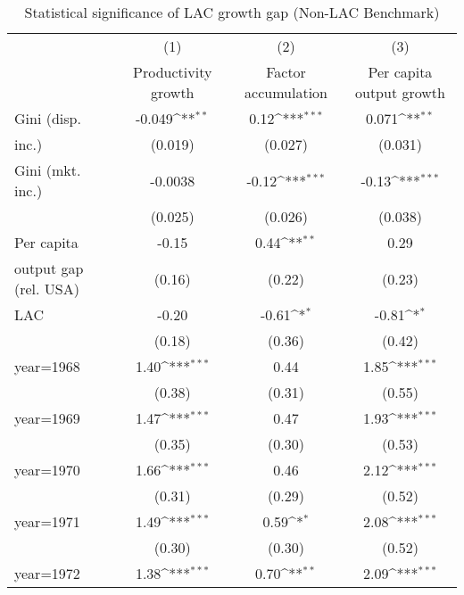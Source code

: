 \begin{sidewaystable}[htbp]\centering
\def\sym#1{\ifmmode^{#1}\else\(^{#1}\)\fi}
\caption{Statistical significance of LAC growth gap (Non-LAC Benchmark)}
\begin{tabular}{l*{3}{c}}
\toprule
                &\multicolumn{1}{c}{(1)}&\multicolumn{1}{c}{(2)}&\multicolumn{1}{c}{(3)}\\
                &\multicolumn{1}{c}{Productivity growth}&\multicolumn{1}{c}{Factor accumulation}&\multicolumn{1}{c}{Per capita output growth}\\
\midrule
Gini (disp.     &   -0.049\sym{**} &     0.12\sym{***}&    0.071\sym{**} \\
inc.)           &  (0.019)         &  (0.027)         &  (0.031)         \\
\addlinespace
Gini (mkt. inc.)&  -0.0038         &    -0.12\sym{***}&    -0.13\sym{***}\\
                &  (0.025)         &  (0.026)         &  (0.038)         \\
\addlinespace
Per capita      &    -0.15         &     0.44\sym{**} &     0.29         \\
output gap (rel. USA)&   (0.16)         &   (0.22)         &   (0.23)         \\
\addlinespace
LAC             &    -0.20         &    -0.61\sym{*}  &    -0.81\sym{*}  \\
                &   (0.18)         &   (0.36)         &   (0.42)         \\
\addlinespace
year=1968       &     1.40\sym{***}&     0.44         &     1.85\sym{***}\\
                &   (0.38)         &   (0.31)         &   (0.55)         \\
\addlinespace
year=1969       &     1.47\sym{***}&     0.47         &     1.93\sym{***}\\
                &   (0.35)         &   (0.30)         &   (0.53)         \\
\addlinespace
year=1970       &     1.66\sym{***}&     0.46         &     2.12\sym{***}\\
                &   (0.31)         &   (0.29)         &   (0.52)         \\
\addlinespace
year=1971       &     1.49\sym{***}&     0.59\sym{*}  &     2.08\sym{***}\\
                &   (0.30)         &   (0.30)         &   (0.52)         \\
\addlinespace
year=1972       &     1.38\sym{***}&     0.70\sym{**} &     2.09\sym{***}\\

\end{tabular}
\end{sidewaystable}
